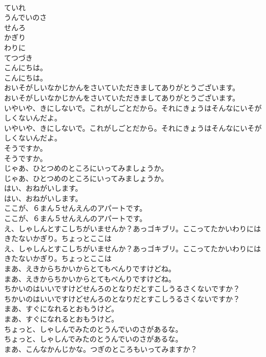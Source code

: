 \documentclass[8pt]{extreport}
\begin{document}
\begin{CJK}{UTF8}{min}
\\	ていれ
\\	うんでいのさ
\\	せんろ
\\	かぎり
\\	わりに
\\	てつづき
\\	こんにちは。
\\	こんにちは。
\\	おいそがしいなかじかんをさいていただきましてありがとうございます。
\\	おいそがしいなかじかんをさいていただきましてありがとうございます。
\\	いやいや、きにしないで。これがしごとだから。それにきょうはそんなにいそがしくないんだよ。
\\	いやいや、きにしないで。これがしごとだから。それにきょうはそんなにいそがしくないんだよ。
\\	そうですか。
\\	そうですか。
\\	じゃあ、ひとつめのところにいってみましょうか。
\\	じゃあ、ひとつめのところにいってみましょうか。
\\	はい、おねがいします。
\\	はい、おねがいします。
\\	ここが、６まん５せんえんのアパートです。
\\	ここが、６まん５せんえんのアパートです。
\\	え、しゃしんとすこしちがいませんか？あっゴキブリ。ここってたかいわりにはきたないかぎり。ちょっとここは
\\	え、しゃしんとすこしちがいませんか？あっゴキブリ。ここってたかいわりにはきたないかぎり。ちょっとここは
\\	まあ、えきからちかいからとてもべんりですけどね。
\\	まあ、えきからちかいからとてもべんりですけどね。
\\	ちかいのはいいですけどせんろのとなりだとすこしうるさくないですか？
\\	ちかいのはいいですけどせんろのとなりだとすこしうるさくないですか？
\\	まあ、すぐになれるとおもうけど。
\\	まあ、すぐになれるとおもうけど。
\\	ちょっと、しゃしんでみたのとうんでいのさがあるな。
\\	ちょっと、しゃしんでみたのとうんでいのさがあるな。
\\	まあ、こんなかんじかな。つぎのところもいってみますか？

\end{CJK}
\end{document}
